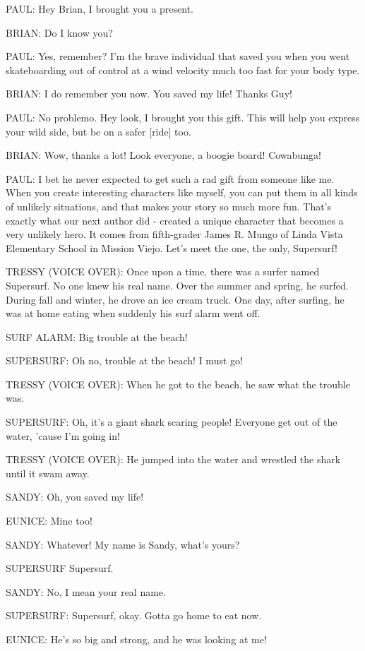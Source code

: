 PAUL:
Hey Brian, I brought you a present.

BRIAN:
Do I know you?

PAUL:
Yes, remember?
I'm the brave individual that saved you when you went skateboarding out of control at a wind velocity much too fast for your body type.

BRIAN:
I do remember you now.
You saved my life!
Thanks Guy!

PAUL:
No problemo.
Hey look, I brought you this gift.
This will help you express your wild side, but be on a safer [ride] too.

BRIAN:
Wow, thanks a lot!
Look everyone, a boogie board!
Cowabunga!

PAUL:
I bet he never expected to get such a rad gift from someone like me.
When you create interesting characters like myself, you can put them in all kinds of unlikely situations, and that makes your story so much more fun.
That's exactly what our next author did - created a unique character that becomes a very unlikely hero.
It comes from fifth-grader James R. Mungo of Linda Vista Elementary School in Mission Viejo.
Let's meet the one, the only, Supersurf!

TRESSY (VOICE OVER):
Once upon a time, there was a surfer named Supersurf.
No one knew his real name.
Over the summer and spring, he surfed.
During fall and winter, he drove an ice cream truck.
One day, after surfing, he was at home eating when suddenly his surf alarm went off.

SURF ALARM:
Big trouble at the beach!

SUPERSURF:
Oh no, trouble at the beach!
I must go!

TRESSY (VOICE OVER):
When he got to the beach, he saw what the trouble was.

SUPERSURF:
Oh, it's a giant shark scaring people!
Everyone get out of the water, 'cause I'm going in!

TRESSY (VOICE OVER):
He jumped into the water and wrestled the shark until it swam away.

SANDY:
Oh, you saved my life!

EUNICE:
Mine too!

SANDY:
Whatever!
My name is Sandy, what's yours?

SUPERSURF
Supersurf.

SANDY:
No, I mean your real name.

SUPERSURF:
Supersurf, okay.
Gotta go home to eat now.

EUNICE:
He's so big and strong, and he was looking at me!

